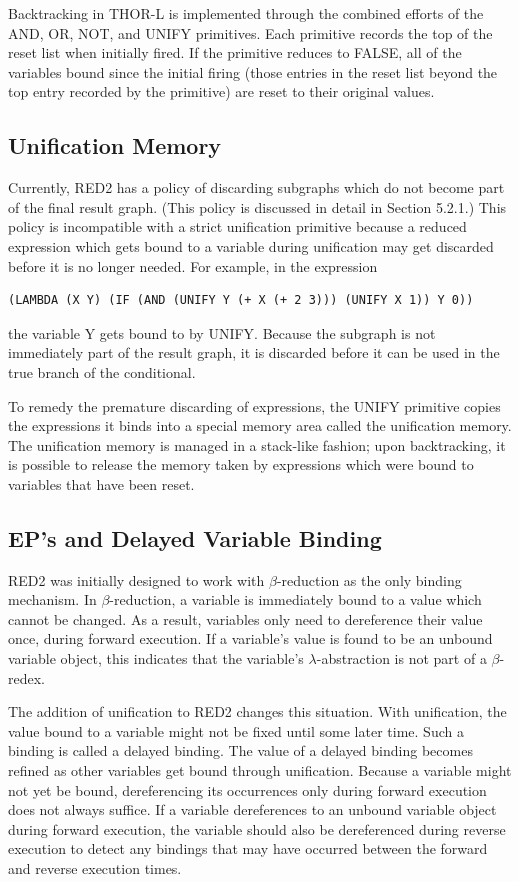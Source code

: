 Backtracking in THOR-L is implemented through the combined efforts of the AND,
OR, NOT, and UNIFY primitives. Each primitive records the top of the reset list
when initially fired. If the primitive reduces to FALSE, all of the variables
bound since the initial firing (those entries in the reset list beyond the top
entry recorded by the primitive) are reset to their original values.

\subsection{Unification Memory}

Currently, RED2 has a policy of discarding subgraphs which do not become part of
the final result graph. (This policy is discussed in detail in Section 5.2.1.)
This policy is incompatible with a strict unification primitive because a
reduced expression which gets bound to a variable during unification may get
discarded before it is no longer needed. For example, in the expression
\begin{verbatim}
(LAMBDA (X Y) (IF (AND (UNIFY Y (+ X (+ 2 3))) (UNIFY X 1)) Y 0))
\end{verbatim}
the variable Y gets bound to  by UNIFY. Because the
 subgraph is not immediately part of the result graph, it is
discarded before it can be used in the true branch of the conditional.

To remedy the premature discarding of expressions, the UNIFY primitive copies
the expressions it binds into a special memory area called the unification
memory. The unification memory is managed in a stack-like fashion; upon
backtracking, it is possible to release the memory taken by expressions which
were bound to variables that have been reset.

\subsection{EP's and Delayed Variable Binding}

RED2 was initially designed to work with \(\beta\)-reduction as the only binding
mechanism. In \(\beta\)-reduction, a variable is immediately bound to a value
which cannot be changed. As a result, variables only need to dereference their
value once, during forward execution. If a variable's value is found to be an
unbound variable object, this indicates that the variable's
\(\lambda\)-abstraction is not part of a \(\beta\)-redex.

The addition of unification to RED2 changes this situation. With unification,
the value bound to a variable might not be fixed until some later time. Such a
binding is called a delayed binding. The value of a delayed binding becomes
refined as other variables get bound through unification. Because a variable
might not yet be bound, dereferencing its occurrences only during forward
execution does not always suffice. If a variable dereferences to an unbound
variable object during forward execution, the variable should also be
dereferenced during reverse execution to detect any bindings that may have
occurred between the forward and reverse execution times.

